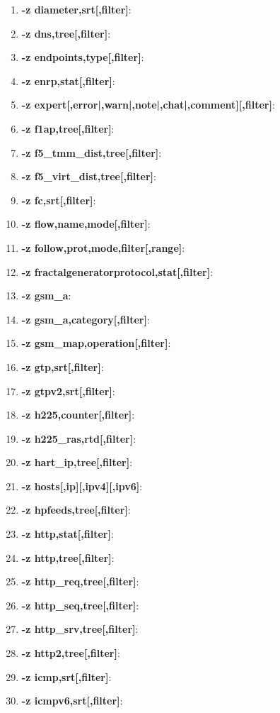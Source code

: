 \begin{enumerate}
    \item \textbf{-z diameter,srt[,filter]}: 
    \item \textbf{-z dns,tree[,filter]}: 
    \item \textbf{-z endpoints,type[,filter]}: 
    \item \textbf{-z enrp,stat[,filter]}: 
    \item \textbf{-z expert[,error|,warn|,note|,chat|,comment][,filter]}: 
    \item \textbf{-z f1ap,tree[,filter]}: 
    \item \textbf{-z f5\_tmm\_dist,tree[,filter]}: 
    \item \textbf{-z f5\_virt\_dist,tree[,filter]}: 
    \item \textbf{-z fc,srt[,filter]}: 
    \item \textbf{-z flow,name,mode[,filter]}: 
    \item \textbf{-z follow,prot,mode,filter[,range]}: 
    \item \textbf{-z fractalgeneratorprotocol,stat[,filter]}: 
    \item \textbf{-z gsm\_a}: 
    \item \textbf{-z gsm\_a,category[,filter]}: 
    \item \textbf{-z gsm\_map,operation[,filter]}: 
    \item \textbf{-z gtp,srt[,filter]}: 
    \item \textbf{-z gtpv2,srt[,filter]}: 
    \item \textbf{-z h225,counter[,filter]}: 
    \item \textbf{-z h225\_ras,rtd[,filter]}: 
    \item \textbf{-z hart\_ip,tree[,filter]}: 
    \item \textbf{-z hosts[,ip][,ipv4][,ipv6]}: 
    \item \textbf{-z hpfeeds,tree[,filter]}: 
    \item \textbf{-z http,stat[,filter]}: 
    \item \textbf{-z http,tree[,filter]}: 
    \item \textbf{-z http\_req,tree[,filter]}: 
    \item \textbf{-z http\_seq,tree[,filter]}: 
    \item \textbf{-z http\_srv,tree[,filter]}: 
    \item \textbf{-z http2,tree[,filter]}: 
    \item \textbf{-z icmp,srt[,filter]}: 
    \item \textbf{-z icmpv6,srt[,filter]}: 

\end{enumerate}
